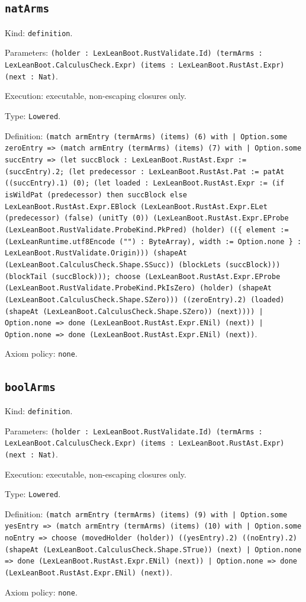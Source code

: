 \documentclass[11pt]{article}
\begin{document}
\subsection*{\texttt{natArms}}
\noindent Kind: \texttt{definition}.\par
\noindent Parameters: \texttt{(holder : LexLeanBoot.RustValidate.Id) (termArms : LexLeanBoot.CalculusCheck.Expr) (items : LexLeanBoot.RustAst.Expr) (next : Nat)}.\par
\noindent Execution: executable, non-escaping closures only.\par
\noindent Type: \texttt{Lowered}.\par
\noindent Definition: \texttt{(match armEntry (termArms) (items) (6) with | Option.some zeroEntry => (match armEntry (termArms) (items) (7) with | Option.some succEntry => (let succBlock : LexLeanBoot.RustAst.Expr := (succEntry).2; (let predecessor : LexLeanBoot.RustAst.Pat := patAt ((succEntry).1) (0); (let loaded : LexLeanBoot.RustAst.Expr := (if isWildPat (predecessor) then succBlock else LexLeanBoot.RustAst.Expr.EBlock (LexLeanBoot.RustAst.Expr.ELet (predecessor) (false) (unitTy (0)) (LexLeanBoot.RustAst.Expr.EProbe (LexLeanBoot.RustValidate.ProbeKind.PkPred) (holder) ((\{ element := (LexLeanRuntime.utf8Encode ("") : ByteArray), width := Option.none \} : LexLeanBoot.RustValidate.Origin))) (shapeAt (LexLeanBoot.CalculusCheck.Shape.SSucc)) (blockLets (succBlock))) (blockTail (succBlock))); choose (LexLeanBoot.RustAst.Expr.EProbe (LexLeanBoot.RustValidate.ProbeKind.PkIsZero) (holder) (shapeAt (LexLeanBoot.CalculusCheck.Shape.SZero))) ((zeroEntry).2) (loaded) (shapeAt (LexLeanBoot.CalculusCheck.Shape.SZero)) (next)))) | Option.none => done (LexLeanBoot.RustAst.Expr.ENil) (next)) | Option.none => done (LexLeanBoot.RustAst.Expr.ENil) (next))}.\par
\noindent Axiom policy: \texttt{none}.\par
\subsection*{\texttt{boolArms}}
\noindent Kind: \texttt{definition}.\par
\noindent Parameters: \texttt{(holder : LexLeanBoot.RustValidate.Id) (termArms : LexLeanBoot.CalculusCheck.Expr) (items : LexLeanBoot.RustAst.Expr) (next : Nat)}.\par
\noindent Execution: executable, non-escaping closures only.\par
\noindent Type: \texttt{Lowered}.\par
\noindent Definition: \texttt{(match armEntry (termArms) (items) (9) with | Option.some yesEntry => (match armEntry (termArms) (items) (10) with | Option.some noEntry => choose (movedHolder (holder)) ((yesEntry).2) ((noEntry).2) (shapeAt (LexLeanBoot.CalculusCheck.Shape.STrue)) (next) | Option.none => done (LexLeanBoot.RustAst.Expr.ENil) (next)) | Option.none => done (LexLeanBoot.RustAst.Expr.ENil) (next))}.\par
\noindent Axiom policy: \texttt{none}.\par
\end{document}
